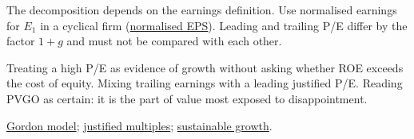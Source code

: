 \begin{qfmethod}
 The decomposition depends on the earnings definition. Use normalised earnings for $E_1$ in a cyclical firm (\hyperref[meth:normalised-earnings]{normalised EPS}). Leading and trailing P/E differ by the factor $1+g$ and must not be compared with each other.

 Treating a high P/E as evidence of growth without asking whether ROE exceeds the cost of equity. Mixing trailing earnings with a leading justified P/E. Reading PVGO as certain: it is the part of value most exposed to disappointment.

 \hyperref[meth:gordon-growth-model]{Gordon model}; \hyperref[meth:justified-multiples]{justified multiples}; \hyperref[meth:sustainable-growth]{sustainable growth}.

\end{qfmethod}

